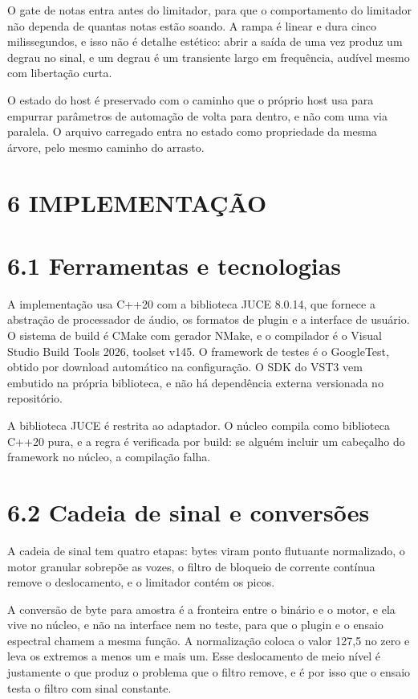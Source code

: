 \documentclass[12pt,a4paper]{article}
\begin{document}
O gate de notas entra antes do limitador, para que o comportamento do limitador não dependa de quantas notas estão soando. A rampa é linear e dura cinco milissegundos, e isso não é detalhe estético: abrir a saída de uma vez produz um degrau no sinal, e um degrau é um transiente largo em frequência, audível mesmo com libertação curta.


O estado do host é preservado com o caminho que o próprio host usa para empurrar parâmetros de automação de volta para dentro, e não com uma via paralela. O arquivo carregado entra no estado como propriedade da mesma árvore, pelo mesmo caminho do arrasto.


\section*{6 IMPLEMENTAÇÃO}

\section*{6.1 Ferramentas e tecnologias}

A implementação usa C++20 com a biblioteca JUCE 8.0.14, que fornece a abstração de processador de áudio, os formatos de plugin e a interface de usuário. O sistema de build é CMake com gerador NMake, e o compilador é o Visual Studio Build Tools 2026, toolset v145. O framework de testes é o GoogleTest, obtido por download automático na configuração. O SDK do VST3 vem embutido na própria biblioteca, e não há dependência externa versionada no repositório.


A biblioteca JUCE é restrita ao adaptador. O núcleo compila como biblioteca C++20 pura, e a regra é verificada por build: se alguém incluir um cabeçalho do framework no núcleo, a compilação falha.


\section*{6.2 Cadeia de sinal e conversões}

A cadeia de sinal tem quatro etapas: bytes viram ponto flutuante normalizado, o motor granular sobrepõe as vozes, o filtro de bloqueio de corrente contínua remove o deslocamento, e o limitador contém os picos.


A conversão de byte para amostra é a fronteira entre o binário e o motor, e ela vive no núcleo, e não na interface nem no teste, para que o plugin e o ensaio espectral chamem a mesma função. A normalização coloca o valor 127,5 no zero e leva os extremos a menos um e mais um. Esse deslocamento de meio nível é justamente o que produz o problema que o filtro remove, e é por isso que o ensaio testa o filtro com sinal constante.
\end{document}

